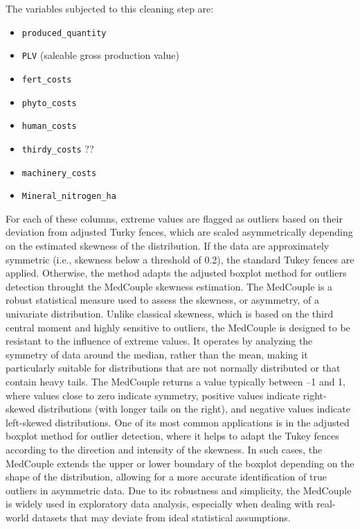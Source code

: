 \documentclass[11pt,a4paper]{article}
\begin{document}
The variables subjected to this cleaning step are:

\begin{itemize}
    \item \texttt{produced\_quantity}
    \item \texttt{PLV} (saleable gross production value)
    \item \texttt{fert\_costs}
    \item \texttt{phyto\_costs}
    \item \texttt{human\_costs}
    \item \texttt{thirdy\_costs} ??
    \item \texttt{machinery\_costs}
    \item \texttt{Mineral\_nitrogen\_ha}
\end{itemize}

For each of these columns, extreme values are flagged as outliers based on their deviation from adjusted Turky fences, which are scaled asymmetrically depending on the estimated skewness of the distribution.
If the data are approximately symmetric (i.e., skewness below a threshold of 0.2), the standard Tukey fences are applied. Otherwise, the method adapts the adjusted boxplot method for outliers detection throught the MedCouple skewness estimation.
The MedCouple is a robust statistical measure used to assess the skewness, or asymmetry, of a univariate distribution. Unlike classical skewness, which is based on the third central moment and highly sensitive to outliers, the MedCouple is designed to be resistant to the influence of extreme values. It operates by analyzing the symmetry of data around the median, rather than the mean, making it particularly suitable for distributions that are not normally distributed or that contain heavy tails. The MedCouple returns a value typically between –1 and 1, where values close to zero indicate symmetry, positive values indicate right-skewed distributions (with longer tails on the right), and negative values indicate left-skewed distributions. One of its most common applications is in the adjusted boxplot method for outlier detection, where it helps to adapt the Tukey fences according to the direction and intensity of the skewness. In such cases, the MedCouple extends the upper or lower boundary of the boxplot depending on the shape of the distribution, allowing for a more accurate identification of true outliers in asymmetric data. Due to its robustness and simplicity, the MedCouple is widely used in exploratory data analysis, especially when dealing with real-world datasets that may deviate from ideal statistical assumptions.
\end{document}
